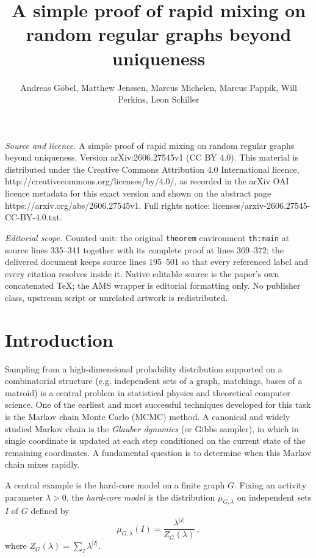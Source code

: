 \documentclass[10pt,a4paper]{amsart}
\begin{document}
\title[A simple proof of rapid mixing on random regular graphs beyo]{A simple proof of rapid mixing on random regular graphs beyond uniqueness}
\author{Andreas Göbel, Matthew Jenssen, Marcus Michelen, Marcus Pappik, Will Perkins, Leon Schiller}
\date{}
\maketitle
\noindent\emph{Source and licence.} A simple proof of rapid mixing on random regular graphs beyond uniqueness. Version arXiv:2606.27545v1 (CC BY 4.0). This material is distributed under the Creative Commons Attribution 4.0 International licence, http://creativecommons.org/licenses/by/4.0/, as recorded in the arXiv OAI licence metadata for this exact version and shown on the abstract page https://arxiv.org/abs/2606.27545v1. Full rights notice: licenses/arxiv-2606.27545-CC-BY-4.0.txt.\par\smallskip
\noindent\textit{Editorial scope.} Counted unit: the original \texttt{theorem} environment \texttt{th:main} at source lines 335--341 together with its complete proof at lines 369--372; the delivered document keeps source lines 195--501 so that every referenced label and every citation resolves inside it. Native editable source is the paper's own concatenated TeX; the AMS wrapper is editorial formatting only. No publisher class, upstream script or unrelated artwork is redistributed.
	\section{Introduction}
	
	Sampling from a high-dimensional probability distribution supported on a combinatorial 
	structure (e.g. independent sets of a graph, matchings, bases of a matroid) is a central problem in statistical physics and theoretical computer science. One of the earliest and most successful techniques developed for this task is the Markov chain Monte Carlo (MCMC) method. 
	A canonical and widely studied Markov chain is the 
	\emph{Glauber dynamics} (or Gibbs sampler), in which in single coordinate is updated at each step conditioned on the current state of the remaining coordinates.  A fundamental question is 
	to determine when this Markov chain mixes rapidly.
	
	A central  example is the hard-core model on a finite graph $G$.  Fixing an activity parameter $\lambda>0$, the \emph{hard-core model} is the distribution $\mu_{G,\lambda}$ on independent sets 
	$I$ of $G$ defined by 
	\[
	\mu_{G,\lambda}(I)= \frac{\lambda^{|I|}}{Z_G(\lambda)}\, ,
	\]
	where $Z_G(\lambda)=\sum_I \lambda^{|I|}$. 
	
\end{document}
